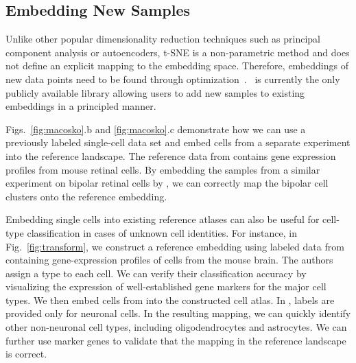 \documentclass[article]{jss}
\newcommand{\opentsne}{\pkg{openTSNE}}
\begin{document}
\subsection{Embedding New Samples}

Unlike other popular dimensionality reduction techniques such as principal
component analysis or autoencoders, t-SNE is a non-parametric method and does
not define an explicit mapping to the embedding space. Therefore, embeddings of
new data points need to be found through
optimization~\citep{policar2019embedding}. \opentsne\ is currently the only
publicly available library allowing users to add new samples to existing
embeddings in a principled manner.

Figs.~\ref{fig:macosko}.b and \ref{fig:macosko}.c demonstrate how we can use a
previously labeled single-cell data set and embed cells from a separate
experiment into the reference landscape. The reference data from
\citet{macosko2015highly} contains gene expression
profiles from mouse retinal cells. By embedding the samples from a similar
experiment on bipolar retinal cells by \citet{shekhar2016comprehensive}, we can correctly map the bipolar cell
clusters onto the reference embedding.

Embedding single cells into existing reference atlases can also be useful for
cell-type classification in cases of unknown cell identities. For instance, in
Fig.~\ref{fig:transform}, we construct a reference embedding using labeled data
from \citet{hochgerner2018conserved} containing
gene-expression profiles of cells from the mouse brain. The authors assign a
type to each cell. We can verify their classification accuracy by visualizing
the expression of well-established gene markers for the major cell types. We
then embed cells from \citet{harris2018classes} into the
constructed cell atlas. In \citet{harris2018classes}, labels are provided only for
neuronal cells. In the resulting mapping, we can quickly identify other
non-neuronal cell types, including oligodendrocytes and astrocytes. We can
further use marker genes to validate that the mapping in the reference landscape
is correct. 
\end{document}
